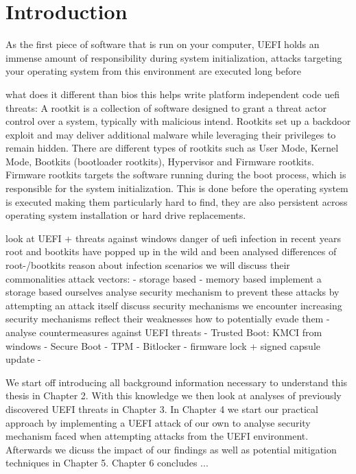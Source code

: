 

\chapter{Introduction}


As the first piece of software that is run on your computer, UEFI holds an immense amount of responsibility during system initialization, attacks targeting your operating system from this environment are executed long before

what does it different than bios
this helps write platform independent code
uefi threats:
A rootkit is a collection of software designed to grant a threat actor control over a system, typically with malicious intend.
Rootkits set up a backdoor exploit and may deliver additional malware while leveraging their privileges to remain hidden.
There are different types of rootkits such as User Mode, Kernel Mode, Bootkits (bootloader rootkits), Hypervisor and Firmware rootkits.
\cite{crowdstrike, techtarget}
Firmware rootkits targets the software running during the boot process, which is responsible for the system initialization. This is done before the operating system is executed making them particularly hard to find, they are also persistent across operating system installation or hard drive replacements.
\cite{crowdstrike}


look at UEFI + threats against windows
danger of uefi infection
in recent years root and bootkits have popped up in the wild and been analysed
differences of root-/bootkits
reason about infection scenarios
we will discuss their commonalities
attack vectors:
- storage based
- memory based
implement a storage based ourselves
analyse security mechanism to prevent these attacks by attempting an attack itself
discuss security mechanisms we encounter
increasing security mechanisms
reflect their weaknesses
how to potentially evade them
- analyse countermeasures against UEFI threats
- Trusted Boot: KMCI from windows
- Secure Boot
- TPM
- Bitlocker
- firmware lock + signed capsule update
-



We start off introducing all background information necessary to understand this thesis in Chapter 2. With this knowledge we then look at analyses of previously discovered UEFI threats in Chapter 3. In Chapter 4 we start our practical approach by implementing a UEFI attack of our own to analyse security mechanism faced when attempting attacks from the UEFI environment. Afterwards we dicuss the impact of our findings as well as potential mitigation techniques in Chapter 5. Chapter 6 concludes ...
